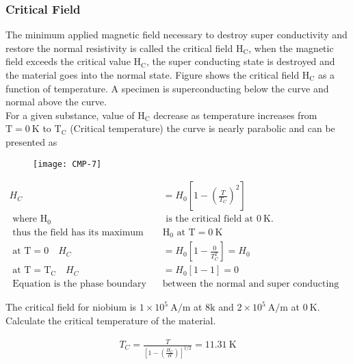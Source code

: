 \subsubsection{Critical Field}
The minimum applied magnetic field necessary to destroy super conductivity and restore the normal resistivity is called the critical field $\mathrm{H}_{\mathrm{C}}$, when the magnetic field exceeds the critical value $\mathrm{H}_{\mathrm{C}}$, the super conducting state is destroyed and the material goes into the normal state. Figure shows the critical field $\mathrm{H}_{\mathrm{C}}$ as a function of temperature. A specimen is superconducting below the curve and normal above the curve. \\
For a given substance, value of $\mathrm{H}_{\mathrm{C}}$ decrease as temperature increases from $\mathrm{T}=0 \mathrm{~K}$ to $\mathrm{T}_{\mathrm{C}}$ (Critical temperature) the curve is nearly parabolic and can be presented as
\begin{figure}[H]
	\centering
	\texttt{[image: CMP-7]}
	\caption{}
	\label{}
\end{figure}
\begin{align*}
H_{C}&=H_{0}\left[1-\left(\frac{T}{T_{C}}\right)^{2}\right]\\
\text { where } \mathrm{H}_{0} &\text { is the critical field at } 0 \mathrm{~K} \text {. }\\
\text { thus the field has its maximum value } &\mathrm{H}_{0} \text { at } \mathrm{T}=0 \mathrm{~K}\\
\text { at } \mathrm{T}=0 \quad H_{C}&=H_{0}\left[1-\frac{0}{T_{C}^{2}}\right]=H_{0}\\
\text { at } \mathrm{T}=\mathrm{T}_{\mathrm{C}} \quad H_{C}&=H_{0}[1-1]=0\\
\text { Equation is the phase boundary }&\text{between the normal and super conducting state. }
\end{align*}
\begin{exercise}
 The critical field for niobium is $1 \times 10^{5} \mathrm{~A} / \mathrm{m}$ at $8 \mathrm{k}$ and $2 \times 10^{5} \mathrm{~A} / \mathrm{m}$ at $0 \mathrm{~K}$. Calculate the critical temperature of the material.
\end{exercise}
\begin{answer}
	\begin{align*}
	T_{C}=\frac{T}{\left[1-\left(\frac{H_{C}}{H}\right)\right]^{1 / 2}}=11.31 \mathrm{~K}
	\end{align*}
\end{answer}
